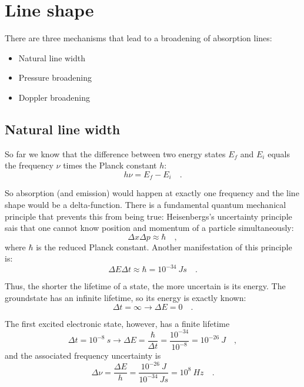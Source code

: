 \section{Line shape}
\label{sec:line_shape}

There are three mechanisms that lead to a broadening of absorption lines:
\begin{itemize}
\item Natural line width
\item Pressure broadening
\item Doppler broadening 
\end{itemize}

\subsection{Natural line width}

So far we know that the difference between two energy states $E_{f}$
and $E_{i}$ equals the frequency $\nu$ times the Planck constant $h$:
\begin{equation}
h \nu = E_f - E_i \quad .
\end{equation}

So absorption (and emission) would happen at exactly one frequency and
the line shape would be a delta-function. There is a fundamental
quantum mechanical principle that prevents this from being true:
Heisenbergs's uncertainty principle sais that one cannot know position
and momentum of a particle simultaneously:
\begin{equation}
\Delta x \Delta p \approx \hbar \quad ,
\end{equation}
where $\hbar$ is the reduced Planck constant. Another manifestation of this principle is:
\begin{equation}
\Delta E \Delta t \approx \hbar = 10^{-34}~J s \quad .
\end{equation}

Thus, the shorter the lifetime of a state, the more uncertain is its energy. 
The groundstate has an infinite lifetime, so its energy is exactly known:
\begin{equation}
\Delta t = \infty \rightarrow \Delta E = 0 \quad .
\end{equation}

The first excited electronic state, however, has a finite lifetime
\begin{equation}
\Delta t = 10^{-8}~s \rightarrow \Delta E = \frac{\hbar}{\Delta t} =
\frac{10^{-34}}{10^{-8}} = 10^{-26}~J \quad ,
\end{equation}
and the associated frequency uncertainty is
\begin{equation}
\Delta \nu = \frac{\Delta E}{h} = \frac{10^{-26}~J}{10^{-34}~Js} =
10^{8}~Hz \quad .
\end{equation}

